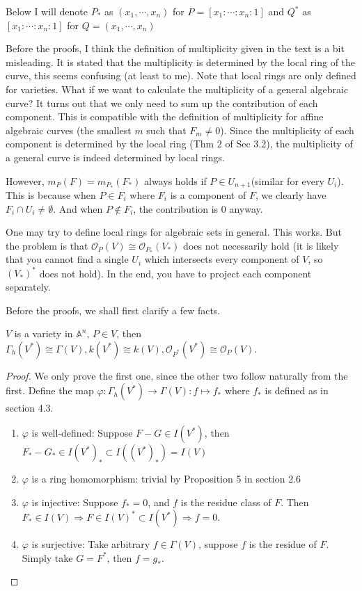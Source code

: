 \documentclass{solution}
\begin{document}
Below I will denote $P_*$ as $(x_1, \cdots, x_n)$ for $P = [x_1:\cdots :x_n:1]$ and $Q^*$ as $[x_1:\cdots:x_n:1]$ for $Q = (x_1, \cdots, x_n)$

Before the proofs, I think the definition of multiplicity given in the text is a bit misleading. It is stated that the multiplicity is determined by the local ring of the curve, this seems confusing (at least to me). Note that local rings are only defined for varieties. What if we want to calculate the multiplicity of a general algebraic curve? It turns out that we only need to sum up the contribution of each component. This is compatible with the definition of multiplicity for affine algebraic curves (the smallest $m$ such that $F_m \ne 0$). Since the multiplicity of each component is determined by the local ring (Thm 2 of Sec 3.2), the multiplicity of a general curve is indeed determined by local rings.

However, $m_P(F) = m_{P_*}(F_*)$ always holds if $P \in U_{n + 1}$(similar for every $U_i$). This is because when $P \in F_i$ where $F_i$ is a component of $F$, we clearly have $F_i \cap U_i \ne \emptyset$. And when $P \notin F_i$, the contribution is $0$ anyway.

\begin{remark}
    One may try to define local rings for algebraic sets in general. This works. But the problem is that $\mathcal{O}_{P}(V) \cong \mathcal{O}_{P_*}(V_*)$ does not necessarily hold (it is likely that you cannot find a single $U_i$ which intersects every component of $V$, so $(V_*)^*$ does not hold). In the end, you have to project each component separately.
\end{remark}

Before the proofs, we shall first clarify a few facts.

\begin{proposition}
    $V$ is a variety in $\mathbb{A}^n$, $P \in V$, then $\Gamma_h(V^*) \cong \Gamma(V), k(V^*) \cong k(V), \mathcal{O}_{P^*}(V^*) \cong \mathcal{O}_{P}(V)$.
\end{proposition}

\begin{proof}
    We only prove the first one, since the other two follow naturally from the first. Define the map $\varphi: \Gamma_h(V^*) \rightarrow \Gamma(V): f \mapsto f_*$ where $f_*$ is defined as in section 4.3.

    \begin{enumerate}
        \item $\varphi$ is well-defined: Suppose $F - G \in I(V^*)$, then $F_* - G_* \in I(V^*)_* \subset I((V^*)_*) = I(V)$
        \item $\varphi$ is a ring homomorphism: trivial by Proposition 5 in section 2.6
        \item $\varphi$ is injective: Suppose $f_* = 0$, and $f$ is the residue class of $F$. Then $F_* \in I(V) \Rightarrow F \in I(V)^* \subset I(V^*) \Rightarrow f = 0$.
        \item $\varphi$ is surjective: Take arbitrary $f \in \Gamma(V)$, suppose $f$ is the residue of $F$. Simply take $G = F^*$, then $f = g_*$.
    \end{enumerate}
\end{proof}
\end{document}
